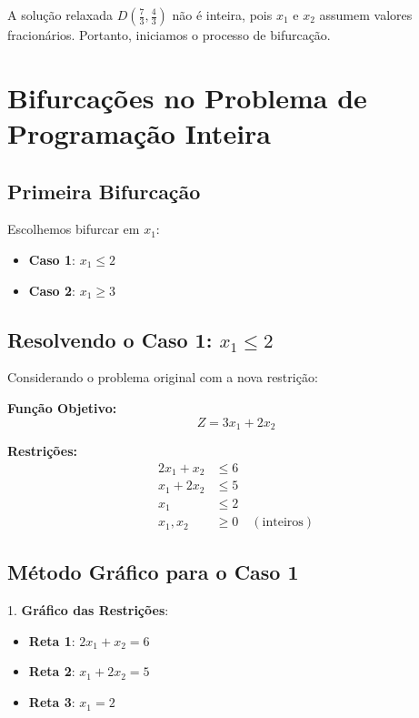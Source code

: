 \documentclass{article}
\begin{document}
A solução relaxada \(D\left(\frac{7}{3}, \frac{4}{3}\right)\) não é inteira, pois \(x_1\) e \(x_2\) assumem valores fracionários. Portanto, iniciamos o processo de bifurcação.

\section{Bifurcações no Problema de Programação Inteira}

\subsection{Primeira Bifurcação}

Escolhemos bifurcar em \(x_1\):
\begin{itemize}
    \item \textbf{Caso 1}: \(x_1 \leq 2\)
    \item \textbf{Caso 2}: \(x_1 \geq 3\)
\end{itemize}

\subsection{Resolvendo o Caso 1: \(x_1 \leq 2\)}

Considerando o problema original com a nova restrição:

\textbf{Função Objetivo:}
\[
Z = 3x_1 + 2x_2
\]

\textbf{Restrições:}
\[
\begin{aligned}
2x_1 + x_2 &\leq 6 \\
x_1 + 2x_2 &\leq 5 \\
x_1 &\leq 2 \\
x_1, x_2 &\geq 0 \quad (\text{inteiros})
\end{aligned}
\]

\subsection{ Método Gráfico para o Caso 1}

1. \textbf{Gráfico das Restrições}:
   \begin{itemize}
       \item \textbf{Reta 1}: \(2x_1 + x_2 = 6\)
       \item \textbf{Reta 2}: \(x_1 + 2x_2 = 5\)
       \item \textbf{Reta 3}: \(x_1 = 2\)
   \end{itemize}
\end{document}
